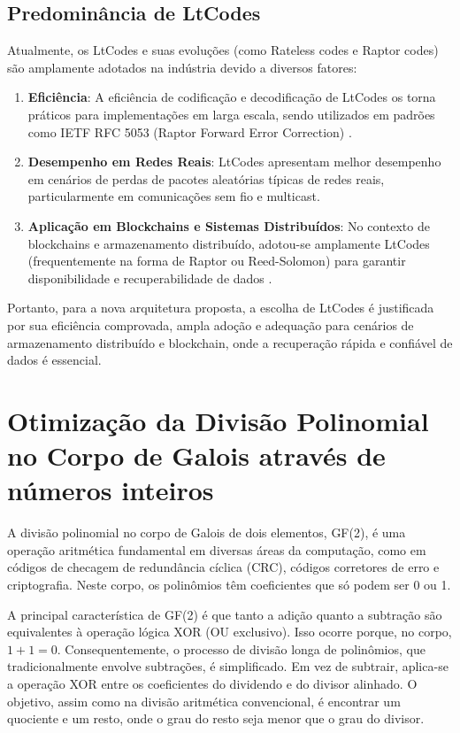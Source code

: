 \subsection{Predominância de LtCodes}

Atualmente, os LtCodes e suas evoluções (como Rateless codes e Raptor codes) são amplamente adotados na indústria devido a diversos fatores:

\begin{enumerate}
    \item \textbf{Eficiência}: A eficiência de codificação e decodificação de LtCodes os torna práticos para implementações em larga escala, 
	sendo utilizados em padrões como IETF RFC 5053 (Raptor Forward Error Correction) \cite{begen2011rfc}.
    
    \item \textbf{Desempenho em Redes Reais}: LtCodes apresentam melhor desempenho em cenários de perdas de pacotes aleatórias típicas de redes reais, 
	particularmente em comunicações sem fio e multicast.
    
    \item \textbf{Aplicação em Blockchains e Sistemas Distribuídos}: No contexto de blockchains e armazenamento distribuído, adotou-se amplamente LtCodes 
	(frequentemente na forma de Raptor ou Reed-Solomon) para garantir disponibilidade e recuperabilidade de dados \cite{blaum2006codes}.
\end{enumerate}

Portanto, para a nova arquitetura proposta, a escolha de LtCodes é justificada por sua eficiência comprovada, ampla adoção e 
adequação para cenários de armazenamento distribuído e blockchain, onde a recuperação rápida e confiável de dados é essencial.

\section{Otimização da Divisão Polinomial no Corpo de Galois através de números inteiros}

A divisão polinomial no corpo de Galois de dois elementos, GF(2), é uma operação aritmética fundamental em diversas áreas da computação, como em códigos de checagem de redundância cíclica (CRC), códigos corretores de erro e criptografia. Neste corpo, os polinômios têm coeficientes que só podem ser 0 ou 1.

A principal característica de GF(2) é que tanto a adição quanto a subtração são equivalentes à operação lógica XOR (OU exclusivo). Isso ocorre porque, no corpo, $1+1=0$. Consequentemente, o processo de divisão longa de polinômios, que tradicionalmente envolve subtrações, é simplificado. Em vez de subtrair, aplica-se a operação XOR entre os coeficientes do dividendo e do divisor alinhado. O objetivo, assim como na divisão aritmética convencional, é encontrar um quociente e um resto, onde o grau do resto seja menor que o grau do divisor.

